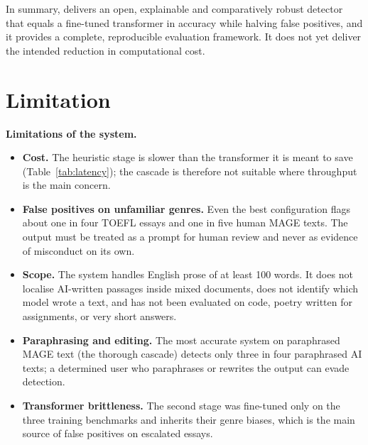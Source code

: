 In summary, \veriscript{} delivers an open, explainable and comparatively robust
detector that equals a fine-tuned transformer in accuracy while halving false
positives, and it provides a complete, reproducible evaluation framework. It
does not yet deliver the intended reduction in computational cost.

\section{Limitation}

\textbf{Limitations of the system.}
\begin{itemize}
  \item \textbf{Cost.} The heuristic stage is slower than the transformer it is
        meant to save (Table~\ref{tab:latency}); the cascade is therefore not
        suitable where throughput is the main concern.
  \item \textbf{False positives on unfamiliar genres.} Even the best
        configuration flags about one in four TOEFL essays and one in five
        human MAGE texts. The output must be treated as a prompt for human
        review and never as evidence of misconduct on its own.
  \item \textbf{Scope.} The system handles English prose of at least 100
        words. It does not localise AI-written passages inside mixed
        documents, does not identify which model wrote a text, and has not been
        evaluated on code, poetry written for assignments, or very short
        answers.
  \item \textbf{Paraphrasing and editing.} The most accurate system on
        paraphrased MAGE text (the thorough cascade) detects only three in four
        paraphrased AI texts; a determined user who paraphrases or rewrites the
        output can evade detection.
  \item \textbf{Transformer brittleness.} The second stage was fine-tuned only
        on the three training benchmarks and inherits their genre biases,
        which is the main source of false positives on escalated essays.
\end{itemize}

